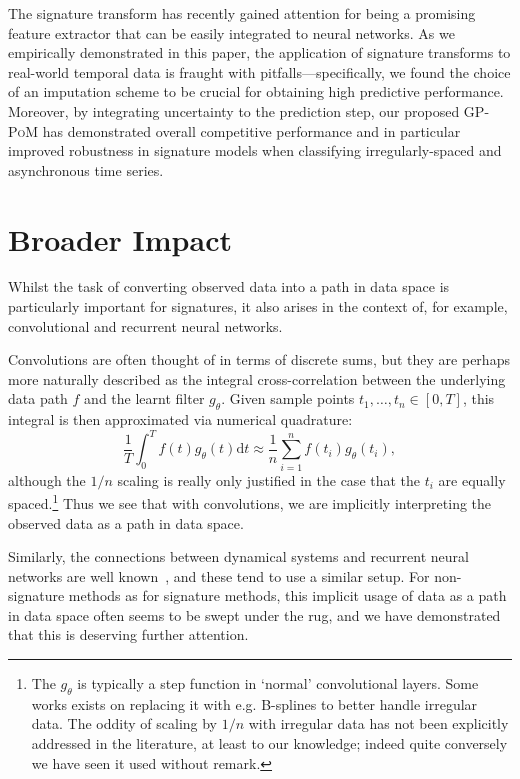 \documentclass{article}
\begin{document}
The signature transform has recently gained attention for being
a promising feature extractor that can be easily integrated to neural
networks. As we empirically demonstrated in this paper, the application
of signature transforms to real-world temporal data is fraught with
pitfalls---specifically, we found the choice of an imputation scheme to
be crucial for obtaining high predictive performance. Moreover, by
integrating uncertainty to the prediction step, our proposed
\textsc{GP-PoM} has demonstrated overall competitive performance and in
particular improved robustness in signature models when classifying irregularly-spaced and asynchronous time series. 

\section*{Broader Impact}
Whilst the task of converting observed data into a path in data space is particularly important for signatures, it also arises in the context of, for example, convolutional and recurrent neural networks.

Convolutions are often thought of in terms of discrete sums, but they are perhaps more naturally described as the integral cross-correlation between the underlying data path $f$ and the learnt filter $g_\theta$. Given sample points $t_1, \ldots, t_n \in [0, T]$, this integral is then approximated via numerical quadrature:
\begin{equation*}
    \frac{1}{T}\int_0^T f(t) g_\theta(t) \mathrm{d}t \approx \frac{1}{n}\sum_{i = 1}^n f(t_i) g_\theta(t_i),
\end{equation*}
although the $1/n$ scaling is really only justified in the case that the $t_i$ are equally spaced.\footnote{The $g_\theta$ is typically a step function in `normal' convolutional layers. Some works exists on replacing it with e.g. B-splines \cite{fey2018splinecnn} to better handle irregular data. The oddity of scaling by $1/n$ with irregular data has not been explicitly addressed in the literature, at least to our knowledge; indeed quite conversely we have seen it used without remark.} Thus we see that with convolutions, we are implicitly interpreting the observed data as a path in data space.

Similarly, the connections between dynamical systems and recurrent neural
networks are well known~\citep{FUNAHASHI1993801, continuousrnn}, and these tend to use a similar setup.
%
For non-signature methods as for signature methods, this implicit usage of data as a path in data space often seems to be swept under the rug, and we have demonstrated that this is deserving further attention.
\end{document}
